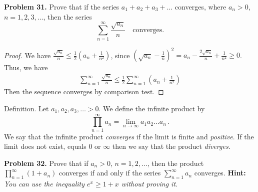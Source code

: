 \documentclass[12pt,leqno]{amsart}
\begin{document}
\medskip


\noindent
{\bf Problem 31.}
Prove that if the series $a_1+a_2+a_3+\ldots$ converges, where $a_n>0$,
$n=1,2,3,\ldots$, then the series
$$
\sum_{n=1}^\infty \frac{\sqrt{a_n}}{n}
\quad
\mbox{converges.}
$$

\begin{proof}
We have $\frac{\sqrt{a_n}}{n}\leq \frac{1}{2}\left(a_n+\frac{1}{n^2}\right)$, since $\left(\sqrt{a_n}-\frac{1}{n}\right)^2=a_n-\frac{2\sqrt{a_n}}{n}+\frac{1}{n^2}\geq 0$. Thus, we have 
\begin{align*}
    \sum_{n=1}^\infty \frac{\sqrt{a_n}}{n} \leq \frac{1}{2}\sum_{n=1}^\infty \left(a_n + \frac{1}{n^2}\right)
\end{align*}
Then the sequence converges by comparison test.
\end{proof}

\medskip

\noindent
{\sc Definition.} Let
$a_1, a_2, a_3,\ldots>0$.
We define the infinite product by
$$
\prod_{n=1}^\infty a_n = \lim_{n\to\infty} a_1 a_2\ldots a_n\, .
$$
We say that the infinite product {\em converges} if the limit is finite and
{\em positive}. If the limit does not exist, equals $0$ or $\infty$ then
we say that the product {\em diverges}.

\medskip

\noindent
{\bf Problem 32.}
Prove that if $a_n>0$, $n=1,2,\ldots$, then
the product $\prod_{n=1}^\infty (1+a_n)$ converges if and only if
the series $\sum_{n=1}^\infty a_n$ converges.
{\bf Hint:} {\em You can use the inequality $e^x\geq 1+x$ without proving it.}
\end{document}
